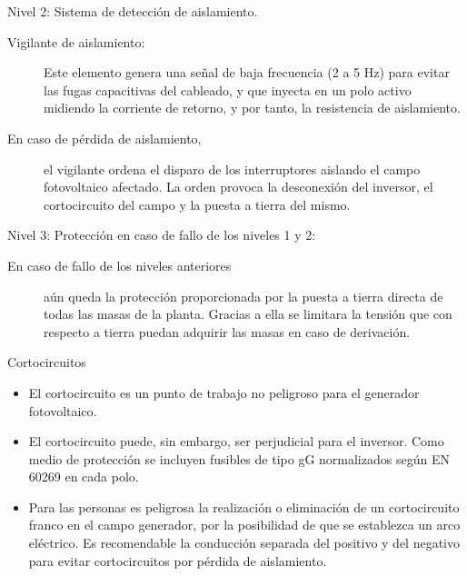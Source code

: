 \documentclass[xcolor={usenames,svgnames,dvipsnames}]{beamer}
\begin{document}
\begin{frame}[label=sec-5-1-3]{Nivel 2: Sistema de detección de aislamiento.}
\begin{description}
\item[{Vigilante de aislamiento:}] Este elemento genera una señal de baja
frecuencia (2 a 5 Hz) para evitar las fugas capacitivas del cableado,
y que inyecta en un polo activo midiendo la corriente de retorno, y
por tanto, la resistencia de aislamiento.

\item[{En caso de pérdida de aislamiento,}] el vigilante ordena el disparo
de los interruptores aislando el campo fotovoltaico afectado. La
orden provoca la desconexión del inversor, el cortocircuito del campo
y la puesta a tierra del mismo.
\end{description}
\end{frame}

\begin{frame}[label=sec-5-1-4]{Nivel 3: Protección en caso de fallo de los niveles 1 y 2:}
\begin{description}
\item[{En caso de fallo de los niveles anteriores}] aún queda la protección
proporcionada por la puesta a tierra directa de todas las masas de la
planta. Gracias a ella se limitara la tensión que con respecto a
tierra puedan adquirir las masas en caso de derivación.
\end{description}
\end{frame}

\begin{frame}[label=sec-5-1-5]{Cortocircuitos}
\begin{itemize}
\item El \alert{cortocircuito} es un punto de trabajo \alert{no peligroso para el
generador fotovoltaico}.

\item El cortocircuito puede, sin embargo, ser \alert{perjudicial para el
inversor}. Como medio de protección se incluyen fusibles de tipo gG
normalizados según EN 60269 en cada polo.

\item Para las personas es \alert{peligrosa la realización o eliminación de un
cortocircuito franco en el campo generador}, por la posibilidad de
que se establezca un arco eléctrico. Es recomendable la \alert{conducción
separada} del positivo y del negativo para evitar cortocircuitos por
pérdida de aislamiento.
\end{itemize}
\end{frame}
\end{document}

